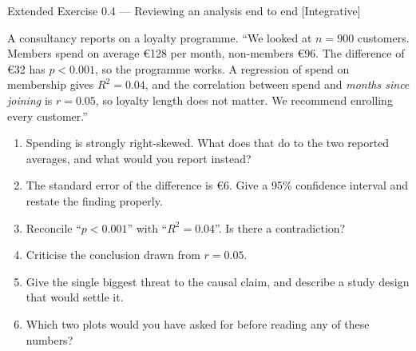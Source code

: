 \documentclass[aspectratio=169,11pt]{beamer}
\begin{document}
\begin{frame}{Extended Exercise 0.4 --- Reviewing an analysis end to end [Integrative]}
  \begin{longexercise}
    A consultancy reports on a loyalty programme. ``We looked at $n = 900$
    customers. Members spend on average \euro 128 per month, non-members
    \euro 96. The difference of \euro 32 has $p < 0.001$, so the programme
    works. A regression of spend on membership gives $R^2 = 0.04$, and the
    correlation between spend and \emph{months since joining} is
    $r = 0.05$, so loyalty length does not matter. We recommend enrolling
    every customer.''
    \begin{enumerate}
      \item Spending is strongly right-skewed. What does that do to the two
            reported averages, and what would you report instead?
      \item The standard error of the difference is \euro 6. Give a 95\%
            confidence interval and restate the finding properly.
      \item Reconcile ``$p < 0.001$'' with ``$R^2 = 0.04$''. Is there a
            contradiction?
      \item Criticise the conclusion drawn from $r = 0.05$.
      \item Give the single biggest threat to the causal claim, and describe
            a study design that would settle it.
      \item Which two plots would you have asked for before reading any of
            these numbers?
    \end{enumerate}
  \end{longexercise}
\end{frame}
\end{document}
